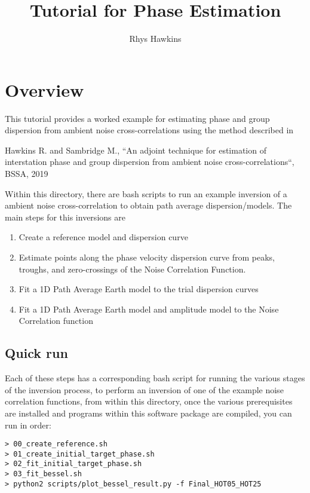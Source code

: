 \documentclass{article}
\begin{document}
\title{Tutorial for Phase Estimation}
\author{Rhys Hawkins}
\maketitle

\section{Overview}

This tutorial provides a worked example for estimating phase and group dispersion
from ambient noise cross-correlations using the method described in

\begin{flushleft}
  Hawkins R. and Sambridge M., ``An adjoint technique for estimation of interstation phase and
  group dispersion from ambient noise cross-correlations``, BSSA, 2019
\end{flushleft}

Within this directory, there are bash scripts to run an example inversion of a ambient noise
cross-correlation to obtain path average dispersion/models. The main steps for this inversions
are

\begin{enumerate}
\item Create a reference model and dispersion curve
\item Estimate points along the phase velocity dispersion curve from peaks, troughs, and zero-crossings
  of the Noise Correlation Function.
\item Fit a 1D Path Average Earth model to the trial dispersion curves
\item Fit a 1D Path Average Earth model and amplitude model to the Noise Correlation function
\end{enumerate}

\subsection{Quick run}

Each of these steps has a corresponding bash script for running the various stages of
the inversion process, to perform an inversion of one of the example noise correlation functions,
from within this directory, once the various prerequisites are installed and programs within
this software package are compiled, you can run in order:

\begin{verbatim}
> 00_create_reference.sh
> 01_create_initial_target_phase.sh
> 02_fit_initial_target_phase.sh
> 03_fit_bessel.sh
> python2 scripts/plot_bessel_result.py -f Final_HOT05_HOT25
\end{verbatim}
\end{document}
